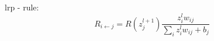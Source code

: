 \documentclass{article}
\begin{document}
lrp - rule: 
\[
    R_{i \leftarrow j} = R(z_j^{l+1}) \frac{z_i^{l} w_{ij}}{\sum\limits_{i} z_i^{l}w_{ij} + b_j}
\]
\end{document}
